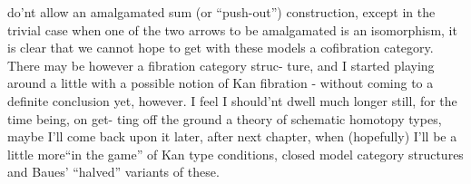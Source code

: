 
do'nt allow  an  amalgamated sum (or ``push-out'') construction,  except
in the trivial case when one of the two arrows to be amalgamated is an
isomorphism,  it is clear that we cannot hope to get with these models
a cofibration category.  There may be however a fibration category struc-%
ture,  and I started playing around a little with a possible notion of
Kan fibration -  without coming to a definite conclusion yet,  however.
I feel I should'nt dwell much longer still,  for the time being,  on get-%
ting off the ground a theory of schematic homotopy types,  maybe I'll
come back upon it later,  after next chapter,  when (hopefully) I'll be
a little more``in the game'' of Kan type conditions,  closed model category
structures  and Baues' ``halved'' variants of these.


